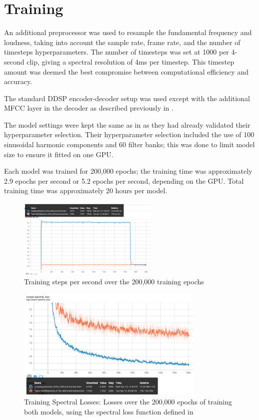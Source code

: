 \section{Training}

An additional preprocessor was used to resample the fundamental frequency and loudness, taking into account the sample rate, frame rate, and the number of timesteps hyperparameters. The number of timesteps was set at 1000 per 4-second clip, giving a spectral resolution of 4ms per timestep. This timestep amount was deemed the best compromise between computational efficiency and accuracy.

The standard DDSP encoder-decoder setup was used except with the additional MFCC layer in the decoder as described previously in .

The model settings were kept the same as in  as they had already validated their hyperparameter selection. Their hyperparameter selection included the use of 100 sinusoidal harmonic components and 60 filter banks; this was done to limit model size to ensure it fitted on one GPU.

Each model was trained for 200,000 epochs; the training time was approximately 2.9 epochs per second or 5.2 epochs per second, depending on the GPU. Total training time was approximately 20 hours per model.

\begin{figure}[H]
    \centering
    \includegraphics[width=0.6\textwidth]{research/training/StepsPerSecond.png}
    \caption{Training steps per second over the 200,000 training epochs}
\end{figure}

\begin{figure}[H]
    \centering
    \includegraphics[width=0.8\textwidth]{research/training/TrainingSpectralLosses.png}
    \caption{Training Spectral Losses: Losses over the 200,000 epochs of training both models, using the spectral loss function defined in }
    \label{fig:training_spectral_losses}
\end{figure}


